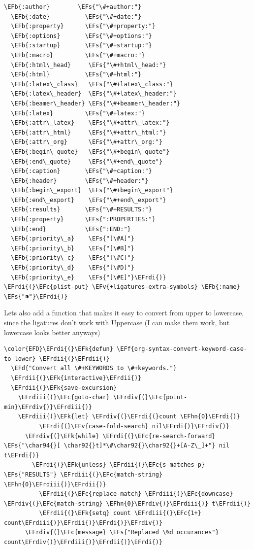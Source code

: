 \documentclass{scrartcl}
\newcommand{\EFk}[1]{\textcolor{EFk}{#1}} %
\newcommand{\EFd}[1]{\textcolor{EFd}{\textit{#1}}} %
\newcommand{\EFs}[1]{\textcolor{EFs}{#1}} %
\newcommand{\EFb}[1]{\textcolor{EFb}{#1}} %
\newcommand{\EFc}[1]{\textcolor{EFc}{#1}} %
\newcommand{\EFv}[1]{\textcolor{EFv}{#1}} %
\newcommand{\EFf}[1]{\textcolor{EFf}{#1}} %
\newcommand{\EFhn}[1]{\textcolor{EFhn}{\textbf{#1}}} %
\newcommand{\EFrdi}[1]{\textcolor{EFrdi}{#1}} %
\newcommand{\EFrdii}[1]{\textcolor{EFrdii}{#1}} %
\newcommand{\EFrdiii}[1]{\textcolor{EFrdiii}{#1}} %
\newcommand{\EFrdiv}[1]{\textcolor{EFrdiv}{#1}} %
\begin{document}
\begin{Code}
\begin{Verbatim}[]
  \EFb{:author}        \EFs{"\#+author:"}
  \EFb{:date}          \EFs{"\#+date:"}
  \EFb{:property}      \EFs{"\#+property:"}
  \EFb{:options}       \EFs{"\#+options:"}
  \EFb{:startup}       \EFs{"\#+startup:"}
  \EFb{:macro}         \EFs{"\#+macro:"}
  \EFb{:html\_head}     \EFs{"\#+html\_head:"}
  \EFb{:html}          \EFs{"\#+html:"}
  \EFb{:latex\_class}   \EFs{"\#+latex\_class:"}
  \EFb{:latex\_header}  \EFs{"\#+latex\_header:"}
  \EFb{:beamer\_header} \EFs{"\#+beamer\_header:"}
  \EFb{:latex}         \EFs{"\#+latex:"}
  \EFb{:attr\_latex}    \EFs{"\#+attr\_latex:"}
  \EFb{:attr\_html}     \EFs{"\#+attr\_html:"}
  \EFb{:attr\_org}      \EFs{"\#+attr\_org:"}
  \EFb{:begin\_quote}   \EFs{"\#+begin\_quote"}
  \EFb{:end\_quote}     \EFs{"\#+end\_quote"}
  \EFb{:caption}       \EFs{"\#+caption:"}
  \EFb{:header}        \EFs{"\#+header:"}
  \EFb{:begin\_export}  \EFs{"\#+begin\_export"}
  \EFb{:end\_export}    \EFs{"\#+end\_export"}
  \EFb{:results}       \EFs{"\#+RESULTS:"}
  \EFb{:property}      \EFs{":PROPERTIES:"}
  \EFb{:end}           \EFs{":END:"}
  \EFb{:priority\_a}    \EFs{"[\#A]"}
  \EFb{:priority\_b}    \EFs{"[\#B]"}
  \EFb{:priority\_c}    \EFs{"[\#C]"}
  \EFb{:priority\_d}    \EFs{"[\#D]"}
  \EFb{:priority\_e}    \EFs{"[\#E]"}\EFrdi{)}
\EFrdi{(}\EFc{plist-put} \EFv{+ligatures-extra-symbols} \EFb{:name} \EFs{"⁍"}\EFrdi{)}
\end{Verbatim}
\end{Code}

Lets also add a function that makes it easy to convert from upper to lowercase,
since the ligatures don't work with Uppercase (I can make them work, but
lowercase looks better anyways)
\begin{Code}
\begin{Verbatim}[]
\color{EFD}\EFrdi{(}\EFk{defun} \EFf{org-syntax-convert-keyword-case-to-lower} \EFrdii{(}\EFrdii{)}
  \EFd{"Convert all \#+KEYWORDS to \#+keywords."}
  \EFrdii{(}\EFk{interactive}\EFrdii{)}
  \EFrdii{(}\EFk{save-excursion}
    \EFrdiii{(}\EFc{goto-char} \EFrdiv{(}\EFc{point-min}\EFrdiv{)}\EFrdiii{)}
    \EFrdiii{(}\EFk{let} \EFrdiv{(}\EFrdi{(}count \EFhn{0}\EFrdi{)}
          \EFrdi{(}\EFv{case-fold-search} nil\EFrdi{)}\EFrdiv{)}
      \EFrdiv{(}\EFk{while} \EFrdi{(}\EFc{re-search-forward} \EFs{"\char94{}[ \char92{}t]*\#\char92{}\char92{}+[A-Z\_]+"} nil t\EFrdi{)}
        \EFrdi{(}\EFk{unless} \EFrdii{(}\EFc{s-matches-p} \EFs{"RESULTS"} \EFrdiii{(}\EFc{match-string} \EFhn{0}\EFrdiii{)}\EFrdii{)}
          \EFrdii{(}\EFc{replace-match} \EFrdiii{(}\EFc{downcase} \EFrdiv{(}\EFc{match-string} \EFhn{0}\EFrdiv{)}\EFrdiii{)} t\EFrdii{)}
          \EFrdii{(}\EFk{setq} count \EFrdiii{(}\EFc{1+} count\EFrdiii{)}\EFrdii{)}\EFrdi{)}\EFrdiv{)}
      \EFrdiv{(}\EFc{message} \EFs{"Replaced \%d occurances"} count\EFrdiv{)}\EFrdiii{)}\EFrdii{)}\EFrdi{)}
\end{Verbatim}
\end{Code}
\end{document}
